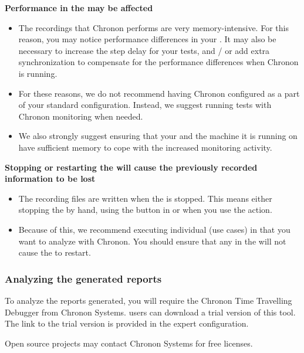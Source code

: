 \textbf{Performance in the \gdaut{} may be affected}
\begin{itemize}
\item The recordings that Chronon performs are very memory-intensive. For this reason, you may notice performance differences in your \gdaut{}. It may also be necessary to increase the step delay for your tests, and / or add extra synchronization to compensate for the performance differences when Chronon is running. 
\item For these reasons, we do not recommend having Chronon configured as a part of your standard \gdaut{} configuration. Instead, we suggest running tests with Chronon monitoring when needed. 
\item We also strongly suggest ensuring that your \gdaut{} and the machine it is running on have sufficient memory to cope with the increased monitoring activity.
\end{itemize}

\textbf{Stopping or restarting the \gdaut{} will cause the previously recorded information to be lost}
\begin{itemize}
\item The recording files are written when the \gdaut{} is stopped. This means either stopping the \gdaut{} by hand, using the  button in \app{} or when you use the  action. 
\item Because of this, we recommend executing individual \gdcases{} (use cases) in \gdsuites{} that you want to analyze with Chronon. You should ensure that any \gdehandlers{} in the \gdsuite{} will not cause the \gdaut{} to restart.
\end{itemize}




\subsubsection{Analyzing the generated reports}
\label{TasksChrononTools}
To analyze the reports generated, you will require the Chronon Time Travelling Debugger from Chronon Systems. \app{} users can download a trial version of this tool. The link to the trial version is provided in the expert \gdaut{} configuration.

Open source projects may contact Chronon Systems for free licenses. 


